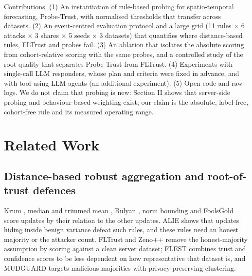 \documentclass[journal]{IEEEtran}
\begin{document}
Contributions. (1) An instantiation of rule-based probing for spatio-temporal forecasting, Probe-Trust, with normalised thresholds that transfer across datasets. (2) An event-centred evaluation protocol and a large grid (11 rules \ensuremath{\times} 6 attacks \ensuremath{\times} 3 shares \ensuremath{\times} 5 seeds \ensuremath{\times} 3 datasets) that quantifies where distance-based rules, FLTrust and probes fail. (3) An ablation that isolates the absolute scoring from cohort-relative scoring with the same probes, and a controlled study of the root quality that separates Probe-Trust from FLTrust. (4) Experiments with single-call LLM responders, whose plan and criteria were fixed in advance, and with tool-using LLM agents (an additional experiment). (5) Open code and raw logs. We do not claim that probing is new: Section II shows that server-side probing and behaviour-based weighting exist; our claim is the absolute, label-free, cohort-free rule and its measured operating range.

\section{Related Work}
\subsection{Distance-based robust aggregation and root-of-trust defences}
Krum \cite{krum}, median and trimmed mean \cite{yin}, Bulyan \cite{bulyan}, norm bounding \cite{normbound} and FoolsGold \cite{foolsgold} score updates by their relation to the other updates. ALIE \cite{alie} shows that updates hiding inside benign variance defeat such rules, and these rules need an honest majority or the attacker count. FLTrust \cite{fltrust} and Zeno++ \cite{zeno} remove the honest-majority assumption by scoring against a clean server dataset; FLEST \cite{flest} combines trust and confidence scores to be less dependent on how representative that dataset is, and MUDGUARD \cite{mudguard} targets malicious majorities with privacy-preserving clustering.
\end{document}

